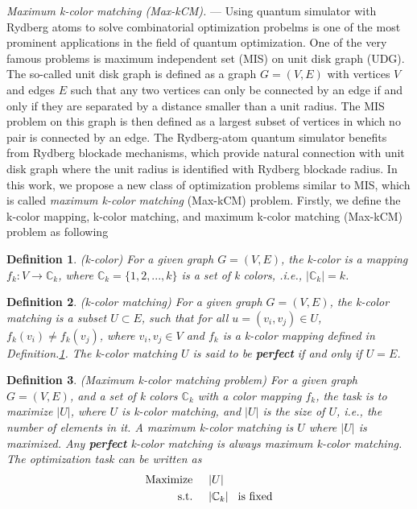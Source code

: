\documentclass[%
 reprint,
nofootinbib,
 amsmath,amssymb,
 aps,
floatfix,
]{revtex4-2}
\newtheorem{definition}{Definition}
\begin{document}
\emph{Maximum k-color matching {\rm (Max-kCM)}.} --- Using quantum simulator with Rydberg atoms to solve combinatorial optimization probelms is one of the most prominent applications in the field of quantum optimization. One of the very famous problems is maximum independent set (MIS) on unit disk graph (UDG). The so-called unit disk graph is defined as a graph $G=(V,E)$ with vertices $V$ and edges $E$ such that any two vertices can only be connected by an edge if and only if they are separated by a distance smaller than a unit radius. The MIS problem on this graph is then defined as a largest subset of vertices in which no pair is connected by an edge. The Rydberg-atom quantum simulator benefits from Rydberg blockade mechanisms, which provide natural connection with unit disk graph where the unit radius is identified with Rydberg blockade radius. In this work, we propose a new class of optimization problems similar to MIS, which is called \emph{maximum k-color matching} (Max-kCM) problem. Firstly, we define the k-color mapping, k-color matching, and maximum k-color matching (Max-kCM) problem as following 
\begin{definition}
\label{def:k-color}
{\rm (k-color)} For a given graph $G = (V,E)$, the k-color is a mapping $f_k: V \to \mathbb{C}_k$, where $\mathbb{C}_k = \{1,2,...,k\}$ is a set of k colors, .i.e., $|\mathbb{C}_k| = k$.
\end{definition}
\begin{definition}
\label{def:k-color-matching}
{\rm (k-color matching)}
For a given graph $G=(V,E)$, the k-color matching is a subset $U \subset E$, such that for all $u=(v_i,v_j) \in {U}$, $f_k(v_i) \neq f_k(v_j)$, where $v_i,v_j \in V$ and $f_k$ is a k-color mapping defined in {\rm Definition.\ref{def:k-color}}. The k-color matching $U$ is said to be {\rm\textbf{perfect}} if and only if $U=E$.
\end{definition}
\begin{definition}
\label{def:maximum-k-color-matching-problem}
{\rm (Maximum k-color matching problem)} For a given graph $G=(V,E)$, and a set of k colors $\mathbb{C}_k$ with a color mapping $f_k$, the task is to maximize $|U|$, where $U$ is k-color matching, and $|U|$ is the size of $U$, i.e., the number of elements in it. A maximum k-color matching is $U$ where $|U|$ is maximized. Any {\rm \textbf{perfect}} k-color matching is always maximum k-color matching. The optimization task can be written as
\begin{align}\label{eq-max-kcm}
\text{\rm Maximize} \hspace{5mm} &|U|  \nonumber \\
\text{\rm s.t.} \hspace{5mm} &|\mathbb{C}_k| \hspace{3mm} \text{\rm is fixed}   
\end{align}
\end{definition}
\end{document}

